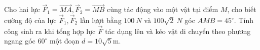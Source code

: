 \begin{bt}%
	Cho hai lực $\vec{F}_1=\overrightarrow{M A}, \vec{F}_2=\overrightarrow{M B}$ cùng tác động vào một vật tại điểm ${M}$, cho biết cường độ của lực $\overrightarrow{F}_1, \overrightarrow{F}_2$ lần lượt bằng $100 {~N}$ và $100 \sqrt{2} {~N}$ góc $\widehat{A M B}=45^{\circ}$. Tính công sinh ra khi tổng hợp lực $\vec{F}$ tác dụng lên và kéo vật di chuyển theo phương ngang góc $60^{\circ}$ một đoạn ${d}=10 \sqrt{5}$m.
\end{bt}
